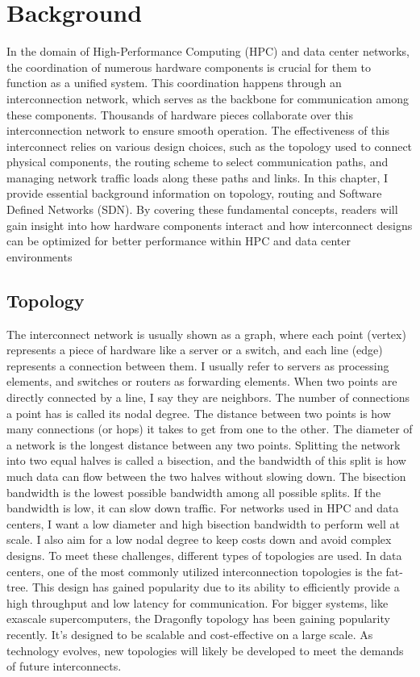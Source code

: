 \chapter{Background} In the domain of High-Performance
Computing (HPC) and data center networks, the coordination of numerous hardware
components is crucial for them to function as a unified system. This
coordination happens through an interconnection network, which serves as the
backbone for communication among these components. Thousands of hardware pieces
collaborate over this interconnection network to ensure smooth operation. The
effectiveness of this interconnect relies on various design choices, such as the
topology used to connect physical components, the routing scheme to select
communication paths, and managing network traffic loads along these paths and
links.  In this chapter, I provide essential background information on topology,
routing and Software Defined Networks (SDN). By covering these fundamental
concepts, readers will gain insight into how hardware components interact and
how interconnect designs can be optimized for better performance within HPC and
data center environments

\section{Topology} The interconnect network is usually shown as a graph, where
each point (vertex) represents a piece of hardware like a server or a switch,
and each line (edge) represents a connection between them. I usually refer to
servers as processing elements, and switches or routers as forwarding elements.
When two points are directly connected by a line, I say they are neighbors. The
number of connections a point has is called its nodal degree. The distance
between two points is how many connections (or hops) it takes to get from one to
the other. The diameter of a network is the longest distance between any two
points.  Splitting the network into two equal halves is called a bisection, and
the bandwidth of this split is how much data can flow between the two halves
without slowing down. The bisection bandwidth is the lowest possible bandwidth
among all possible splits.  If the bandwidth is low, it can slow down traffic.
For networks used in HPC and data centers, I want a low diameter and high
bisection bandwidth to perform well at scale. I also aim for a low nodal degree
to keep costs down and avoid complex designs.  To meet these challenges,
different types of topologies are used. In data centers, one of the most
commonly utilized interconnection topologies is the fat-tree. This design has
gained popularity due to its ability to efficiently provide a high throughput
and low latency for communication. For bigger systems, like exascale
supercomputers, the Dragonfly topology has been gaining popularity recently.
It's designed to be scalable and cost-effective on a large scale. As technology
evolves, new topologies will likely be developed to meet the demands of future
interconnects.

